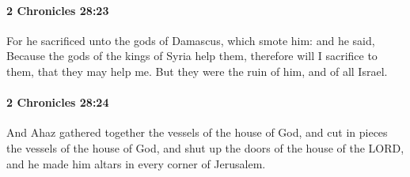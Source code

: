 		\paragraph{2 Chronicles 28:23} %
			\label{2CHRONICLES-28-23}

			For he sacrificed unto the gods of Damascus, which smote him: and he said, Because the gods of the kings of Syria help them, therefore will I sacrifice to them, that they may help me. But they were the ruin of him, and of all Israel.


		\paragraph{2 Chronicles 28:24} %
			\label{2CHRONICLES-28-24}

			And Ahaz gathered together the vessels of the house of God, and cut in pieces the vessels of the house of God, and shut up the doors of the house of the LORD, and he made him altars in every corner of Jerusalem.

